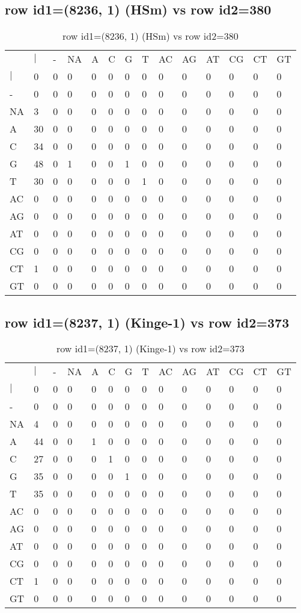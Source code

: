 \subsection{row id1=(8236, 1) (HSm) vs row id2=380}
\begin{center}
\begin{longtable}{|l|l|l|l|l|l|l|l|l|l|l|l|l|l|}
\caption{row id1=(8236, 1) (HSm) vs row id2=380} \label{table_dm162}\\
\hline
\\
\hline
&$|$&-&NA&A&C&G&T&AC&AG&AT&CG&CT&GT\\
$|$&0&0&0&0&0&0&0&0&0&0&0&0&0\\
-&0&0&0&0&0&0&0&0&0&0&0&0&0\\
NA&3&0&0&0&0&0&0&0&0&0&0&0&0\\
A&30&0&0&0&0&0&0&0&0&0&0&0&0\\
C&34&0&0&0&0&0&0&0&0&0&0&0&0\\
G&48&0&1&0&0&1&0&0&0&0&0&0&0\\
T&30&0&0&0&0&0&1&0&0&0&0&0&0\\
AC&0&0&0&0&0&0&0&0&0&0&0&0&0\\
AG&0&0&0&0&0&0&0&0&0&0&0&0&0\\
AT&0&0&0&0&0&0&0&0&0&0&0&0&0\\
CG&0&0&0&0&0&0&0&0&0&0&0&0&0\\
CT&1&0&0&0&0&0&0&0&0&0&0&0&0\\
GT&0&0&0&0&0&0&0&0&0&0&0&0&0\\
\hline
\end{longtable}
\end{center}

\subsection{row id1=(8237, 1) (Kinge-1) vs row id2=373}
\begin{center}
\begin{longtable}{|l|l|l|l|l|l|l|l|l|l|l|l|l|l|}
\caption{row id1=(8237, 1) (Kinge-1) vs row id2=373} \label{table_dm164}\\
\hline
\\
\hline
&$|$&-&NA&A&C&G&T&AC&AG&AT&CG&CT&GT\\
$|$&0&0&0&0&0&0&0&0&0&0&0&0&0\\
-&0&0&0&0&0&0&0&0&0&0&0&0&0\\
NA&4&0&0&0&0&0&0&0&0&0&0&0&0\\
A&44&0&0&1&0&0&0&0&0&0&0&0&0\\
C&27&0&0&0&1&0&0&0&0&0&0&0&0\\
G&35&0&0&0&0&1&0&0&0&0&0&0&0\\
T&35&0&0&0&0&0&0&0&0&0&0&0&0\\
AC&0&0&0&0&0&0&0&0&0&0&0&0&0\\
AG&0&0&0&0&0&0&0&0&0&0&0&0&0\\
AT&0&0&0&0&0&0&0&0&0&0&0&0&0\\
CG&0&0&0&0&0&0&0&0&0&0&0&0&0\\
CT&1&0&0&0&0&0&0&0&0&0&0&0&0\\
GT&0&0&0&0&0&0&0&0&0&0&0&0&0\\
\hline
\end{longtable}
\end{center}

